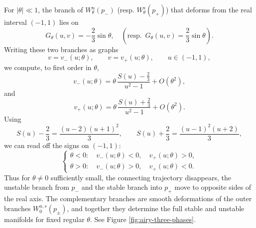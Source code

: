 \documentclass[11pt]{amsart}
\theoremstyle{plain}
\begin{document}
For \(|\theta|\ll1\), the branch of \(W^u_\theta(p_-)\) (resp. $W_{\theta}^s(p_+)$) that deforms from the real interval \((-1,1)\) lies on
\begin{equation*}\label{eq:airy-level-minus}
G_\theta(u,v)=-\frac23\sin\theta, \quad (\text{resp. }\, G_\theta(u,v)=\frac23\sin\theta).
\end{equation*}
Writing these two branches as graphs
\begin{equation*}
v=v_-(u;\theta),
\qquad
v=v_+(u;\theta),
\qquad
u\in(-1,1),
\end{equation*}
we compute, to first order in \(\theta\),
\begin{equation*}\label{eq:airy-small-branch-minus}
v_-(u;\theta)
=
\theta\,\frac{S(u)-\frac23}{u^2-1}
+
O(\theta^2),
\end{equation*}
and
\begin{equation*}\label{eq:airy-small-branch-plus}
v_+(u;\theta)
=
\theta\,\frac{S(u)+\frac23}{u^2-1}
+
O(\theta^2).
\end{equation*}
Using
\begin{equation*}
S(u)-\frac23=\frac{(u-2)(u+1)^2}{3},
\qquad
S(u)+\frac23=\frac{(u-1)^2(u+2)}{3},
\end{equation*}
we can read off the signs on \((-1,1)\):
\begin{equation*}\label{eq:airy-sign-conclusion}
\begin{cases}
\theta<0:\quad v_-(u;\theta)<0,\quad v_+(u;\theta)>0,\\[4pt]
\theta>0:\quad v_-(u;\theta)>0,\quad v_+(u;\theta)<0.
\end{cases}
\end{equation*}
Thus for \(\theta\neq0\) sufficiently small, the connecting trajectory disappears, the unstable branch from \(p_-\) and the stable branch into \(p_+\) move to opposite sides of the real axis.  The complementary branches are smooth deformations of the outer branches $W_0^{u,s}(p_{\pm})$, and together they determine the full stable and unstable manifolds for fixed regular \(\theta\). See Figure \ref{fig:airy-three-phases}. 
\end{document}
